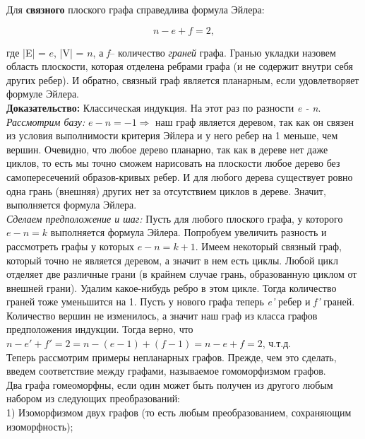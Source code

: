 \documentclass[12pt]{article}
\begin{document}
Для \textbf{связного} плоского графа справедлива формула Эйлера:

$$\mathit{n - e + f = 2,}$$

где |E| = \(\mathit{e}\), |V| = \(\mathit{n}\), а \textit{f}-- количество \textit{граней} графа. Гранью укладки назовем область плоскости, которая отделена ребрами графа (и не содержит внутри себя других ребер). И обратно, связный граф является планарным, если удовлетворяет формуле Эйлера.\\

\textbf{Доказательство: } Классическая индукция. На этот раз по разности \textit{e - n}.\\

\textit{Рассмотрим базу:} \(\mathit{e - n = -1} \Rightarrow  \) наш граф является деревом, так как он связен из условия выполнимости критерия Эйлера и у него ребер на 1 меньше, чем вершин. Очевидно, что любое дерево планарно, так как в дереве нет даже циклов, то есть мы точно сможем нарисовать на плоскости любое дерево без самопересечений образов-кривых ребер. И для любого дерева существует ровно одна грань (внешняя) других нет за отсутствием циклов в дереве. Значит, выполняется формула Эйлера.\\

\textit{Сделаем предположение и шаг:} Пусть для любого плоского графа, у которого \(\mathit{e - n = k}\) выполняется формула Эйлера. Попробуем увеличить разность и рассмотреть графы у которых \(\mathit{e - n = k + 1}\). Имеем некоторый связный граф, который точно не является деревом, а значит в нем есть циклы. Любой цикл отделяет две различные грани (в крайнем случае грань, образованную циклом от внешней грани). Удалим какое-нибудь ребро в этом цикле. Тогда количество граней тоже уменьшится на 1. Пусть у нового графа теперь \textit{e'} ребер и \textit{f'} граней. Количество вершин не изменилось, а значит наш граф из класса графов предположения индукции. Тогда верно, что \(\mathit{n - e' + f' = 2 = n - (e - 1) + (f - 1) = n - e + f = 2}\), ч.т.д.\\

Теперь рассмотрим примеры непланарных графов. Прежде, чем это сделать, введем соответствие между графами, называемое гомоморфизмом графов. \\

Два графа гомеоморфны, если один может быть получен из другого любым набором из следующих преобразований:\\

1) Изоморфизмом двух графов (то есть любым преобразованием, сохраняющим изоморфность);
\end{document}
